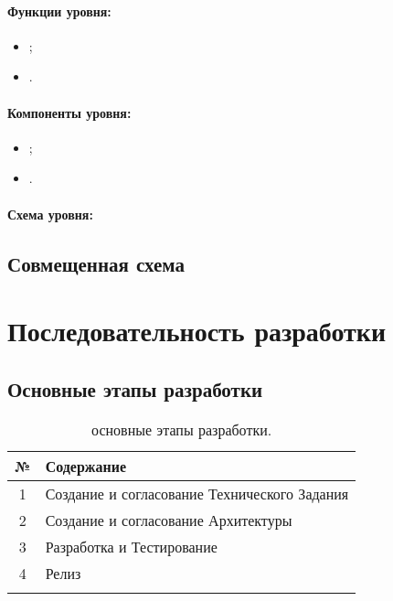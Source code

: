 \documentclass[12pt,a4paper,fullpage,titlepage]{article}
\begin{document}
\paragraph{Функции уровня:}
\begin{itemize}
	\item ;
	\item .\\
\end{itemize}

\paragraph{Компоненты уровня:}
\begin{itemize}
	\item ;
	\item .\\
\end{itemize}

\paragraph{Схема уровня:}

\newpage
\subsection{Совмещенная схема}

\newpage
\section{Последовательность разработки}
\subsection{Основные этапы разработки}
\begin{table}[h]
\begin{tabularx}{\textwidth}{|c|X|}
	\hline
	 № & Содержание\\
	\hline
	1 & Создание и согласование Технического Задания\\
	\hline
	2 & Создание и согласование Архитектуры\\
	\hline
	3 & Разработка и Тестирование\\
	\hline
	4 & Релиз\\
	\hline
	 & \\
	\hline
\end{tabularx}
\caption{основные этапы разработки.}
\end{table}
\end{document}
